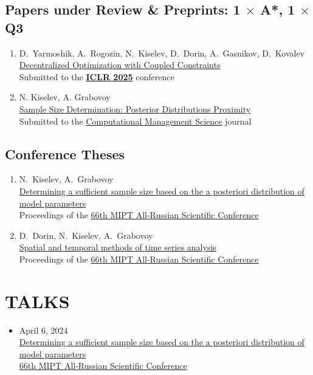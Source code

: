 \documentclass[11pt,a4paper]{moderncv}
\begin{document}
\subsection{Papers under Review \& Preprints: 1 $\times$ A*, 1 $\times$ Q3}
\begin{enumerate}%
    \item D.~Yarmoshik, A.~Rogozin, N.~Kiselev, D.~Dorin, A.~Gasnikov, D.~Kovalev\\
    \href{https://arxiv.org/abs/2407.02020}{Decentralized Optimization with Coupled Constraints}\\
    Submitted to the \href{https://neurips.cc}{\textbf{ICLR 2025}} conference
    \item N. Kiselev, A. Grabovoy\\
    \href{https://github.com/kisnikser/Posterior-Distributions-Proximity}{Sample Size Determination: Posterior Distributions Proximity}\\
    Submitted to the \href{https://link.springer.com/journal/10287}{Computational Management Science} journal
\end{enumerate}
\subsection{Conference Theses}
\begin{enumerate}%
    \item N.~Kiselev, A.~Grabovoy\\
    \href{https://old.mipt.ru/upload/medialibrary/d79/fpmi.pdf}{Determining a sufficient sample size based on the a posteriori distribution of model parameters}\\
    Proceedings of the \href{https://conf.mipt.ru/}{66th MIPT All-Russian Scientific Conference}
    \item D.~Dorin, N.~Kiselev, A.~Grabovoy\\
    \href{https://old.mipt.ru/upload/medialibrary/d79/fpmi.pdf}{Spatial and temporal methods of time series analysis}\\
    Proceedings of the \href{https://conf.mipt.ru/}{66th MIPT All-Russian Scientific Conference}
\end{enumerate}

\section{TALKS}
\begin{itemize}
    \item April 6, 2024\\
    \href{https://www.youtube.com/live/WnIRaRl730A?si=q0eScgnDP2ZidCpK&t=1723}{Determining a sufficient sample size based on the a posteriori distribution of model parameters}\\
    \href{https://conf.mipt.ru/}{66th MIPT All-Russian Scientific Conference}
\end{itemize}
\end{document}
